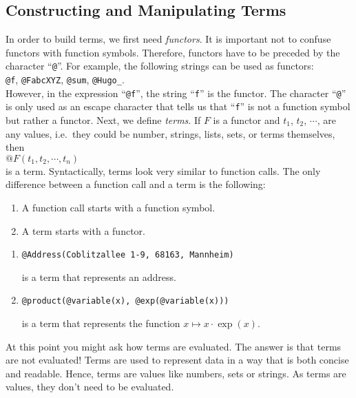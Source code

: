 \subsection{Constructing and Manipulating Terms}
In order to build terms, we first need \colorbox{amethyst}{\emph{functors}}.  It is important not to confuse functors with
function symbols.  Therefore, functors have to be preceded by the character  
``\texttt{@}''.
For example, the following strings can be used as functors:
\\[0.2cm]
\hspace*{1.3cm}
\texttt{@f}, \quad \texttt{@FabcXYZ}, \quad \texttt{@sum}, \quad \texttt{@Hugo\_}.
\\[0.2cm]
However, in the expression ``\texttt{@f}'', the string ``\texttt{f}'' is the functor.  The
character ``\texttt{@}'' is only used as an escape character that tells us that ``\texttt{f}'' is
not a function symbol but rather a functor.  Next, we define \colorbox{amethyst}{\emph{terms}}.  If $F$ is a functor and 
$t_1$, $t_2$, $\cdots$, are any values, i.e.~they could be number, strings, lists, sets, or terms
themselves, then
\\[0.2cm]
\hspace*{1.3cm}
$\texttt{@}F(t_1, t_2, \cdots, t_n)$
\\[0.2cm]
is a term.  Syntactically, terms look very similar to function calls.  The only difference between a function call
and a term is the following: 
\begin{enumerate}
\item A function call starts with a function symbol. 
\item A term starts with a functor. 
\end{enumerate}


\examplesEng
\begin{enumerate}
\item \texttt{@Address(Coblitzallee 1-9, 68163, Mannheim)}

      is a term that represents an address.
\item \texttt{@product(@variable(x), @exp(@variable(x)))}

      is a term that represents the  function $x \mapsto x \cdot \exp(x)$.  
      \eox
\end{enumerate}
At this point you might ask how terms are evaluated.  The answer is that terms
\colorbox{amethyst}{are not evaluated!}  
Terms are used to represent data in a way that is both concise and readable.  Hence, terms are values like
numbers, sets or strings.  As terms are values, they don't need to be evaluated.

